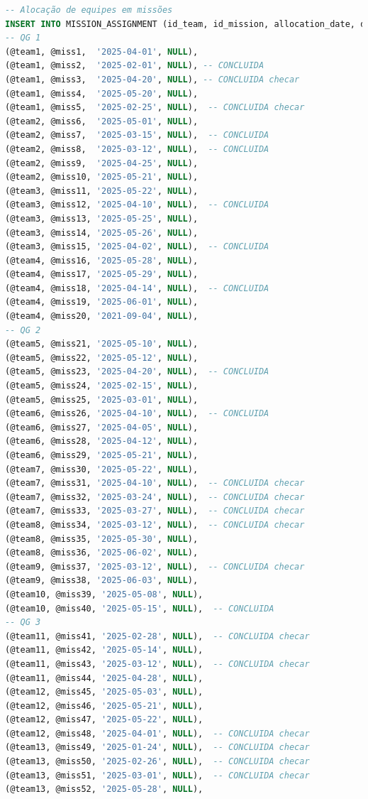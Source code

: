 \documentclass[12pt,a4paper]{report}
\begin{document}
\begin{lstlisting}[language=SQL, caption=population.sql]
-- Alocação de equipes em missões
INSERT INTO MISSION_ASSIGNMENT (id_team, id_mission, allocation_date, deallocation_date) VALUES
-- QG 1
(@team1, @miss1,  '2025-04-01', NULL),
(@team1, @miss2,  '2025-02-01', NULL), -- CONCLUIDA
(@team1, @miss3,  '2025-04-20', NULL), -- CONCLUIDA checar
(@team1, @miss4,  '2025-05-20', NULL),
(@team1, @miss5,  '2025-02-25', NULL),  -- CONCLUIDA checar
(@team2, @miss6,  '2025-05-01', NULL),
(@team2, @miss7,  '2025-03-15', NULL),  -- CONCLUIDA 
(@team2, @miss8,  '2025-03-12', NULL),  -- CONCLUIDA 
(@team2, @miss9,  '2025-04-25', NULL),
(@team2, @miss10, '2025-05-21', NULL),
(@team3, @miss11, '2025-05-22', NULL),
(@team3, @miss12, '2025-04-10', NULL),  -- CONCLUIDA 
(@team3, @miss13, '2025-05-25', NULL),
(@team3, @miss14, '2025-05-26', NULL),
(@team3, @miss15, '2025-04-02', NULL),  -- CONCLUIDA 
(@team4, @miss16, '2025-05-28', NULL),
(@team4, @miss17, '2025-05-29', NULL),
(@team4, @miss18, '2025-04-14', NULL),  -- CONCLUIDA 
(@team4, @miss19, '2025-06-01', NULL),
(@team4, @miss20, '2021-09-04', NULL),
-- QG 2
(@team5, @miss21, '2025-05-10', NULL),
(@team5, @miss22, '2025-05-12', NULL),
(@team5, @miss23, '2025-04-20', NULL),  -- CONCLUIDA 
(@team5, @miss24, '2025-02-15', NULL),
(@team5, @miss25, '2025-03-01', NULL),
(@team6, @miss26, '2025-04-10', NULL),  -- CONCLUIDA 
(@team6, @miss27, '2025-04-05', NULL),
(@team6, @miss28, '2025-04-12', NULL),
(@team6, @miss29, '2025-05-21', NULL),
(@team7, @miss30, '2025-05-22', NULL),
(@team7, @miss31, '2025-04-10', NULL),  -- CONCLUIDA checar
(@team7, @miss32, '2025-03-24', NULL),  -- CONCLUIDA checar
(@team7, @miss33, '2025-03-27', NULL),  -- CONCLUIDA checar
(@team8, @miss34, '2025-03-12', NULL),  -- CONCLUIDA checar
(@team8, @miss35, '2025-05-30', NULL),
(@team8, @miss36, '2025-06-02', NULL),
(@team9, @miss37, '2025-03-12', NULL),  -- CONCLUIDA checar
(@team9, @miss38, '2025-06-03', NULL),
(@team10, @miss39, '2025-05-08', NULL),
(@team10, @miss40, '2025-05-15', NULL),  -- CONCLUIDA 
-- QG 3
(@team11, @miss41, '2025-02-28', NULL),  -- CONCLUIDA checar
(@team11, @miss42, '2025-05-14', NULL),
(@team11, @miss43, '2025-03-12', NULL),  -- CONCLUIDA checar
(@team11, @miss44, '2025-04-28', NULL),
(@team12, @miss45, '2025-05-03', NULL),
(@team12, @miss46, '2025-05-21', NULL),
(@team12, @miss47, '2025-05-22', NULL),
(@team12, @miss48, '2025-04-01', NULL),  -- CONCLUIDA checar
(@team13, @miss49, '2025-01-24', NULL),  -- CONCLUIDA checar
(@team13, @miss50, '2025-02-26', NULL),  -- CONCLUIDA checar
(@team13, @miss51, '2025-03-01', NULL),  -- CONCLUIDA checar
(@team13, @miss52, '2025-05-28', NULL),

\end{lstlisting}
\end{document}
